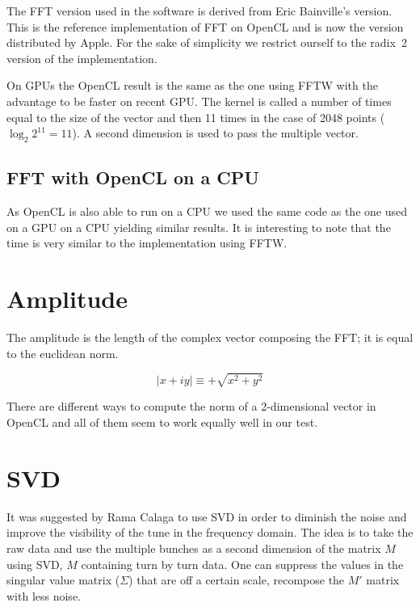 The \gls{FFT} version used in the software is derived from Eric Bainville's version. This is the reference implementation of \gls{FFT} on \gls{OpenCL} and is now the version distributed by Apple\cite{bainville11}. For the sake of simplicity we restrict ourself to the radix~2 version of the implementation.

On \glspl{GPU} the \gls{OpenCL} result is the same as the one using \gls{FFTW} with the advantage to be faster on recent \gls{GPU}. The kernel is called a number of times equal to the size of the vector and then 11 times in the case of 2048 points ($\log_{2}{2^{11}} = 11$). A second dimension is used to pass the multiple vector.

\subsection{FFT with OpenCL on a CPU}

As \gls{OpenCL} is also able to run on a \gls{CPU} we used the same code as the one used on a \gls{GPU} on a \gls{CPU} yielding similar results. It is interesting to note that the time is very similar to the implementation using \gls{FFTW}.

\section{Amplitude}
\label{sec:amplitude}

The amplitude is the length of the complex vector composing the \gls{FFT}; it is equal to the euclidean norm. 

$$\mid x + i y \mid \equiv +\sqrt{x^2 + y^2}$$ 

There are different ways to compute the norm of a 2-dimensional vector in \gls{OpenCL} and all of them seem to work equally well in our test.

\section{SVD}
\label{sec:SVD}

It was suggested by Rama Calaga to use \gls{SVD} in order to diminish the noise and improve the visibility of the tune in the frequency domain. The idea is to take the raw data and use the multiple bunches as a second dimension of the matrix $M$ using SVD, $M$ containing turn by turn data. One can suppress the values in the singular value matrix ($\Sigma$) that are off a certain scale, recompose the $M'$ matrix with less noise.

